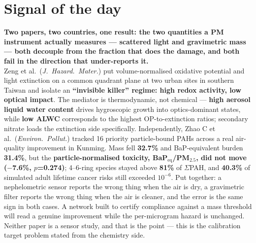 \documentclass[10pt]{article}
\begin{document}
\vspace{6mm}

\section*{\sffamily\bfseries\color{Deep}Signal of the day}
\vspace{-1.5mm}{\color{Amber}\rule{\linewidth}{1.1pt}}\vspace{2.5mm}

\begin{keybox}
{\sffamily\bfseries\small\color{Deep}Two papers, two countries, one result: the two
quantities a PM instrument actually measures --- scattered light and gravimetric mass ---
both decouple from the fraction that does the damage, and both fail in the direction that
under-reports it.}\\[1.4mm]
\footnotesize
Zeng et al.\ (\textit{J.\ Hazard.\ Mater.}) put volume-normalised oxidative potential and
light extinction on a common quadrant plane at two urban sites in southern Taiwan and
isolate an \textbf{``invisible killer'' regime: high redox activity, low optical impact}.
The mediator is thermodynamic, not chemical --- \textbf{high aerosol liquid water content}
drives hygroscopic growth into optics-dominant states, while \textbf{low ALWC} corresponds
to the highest OP-to-extinction ratios; secondary nitrate loads the extinction side
specifically. Independently, Zhao C et al.\ (\textit{Environ.\ Pollut.}) tracked 16 priority
particle-bound PAHs across a real air-quality improvement in Kunming. Mass fell
\textbf{32.7\%} and BaP-equivalent burden \textbf{31.4\%}, but the
\textbf{particle-normalised toxicity, BaP$_{\mathrm{eq}}$/PM$_{2.5}$, did not move
($-$7.6\%, $p$=0.274)}; 4--6-ring species stayed above \textbf{81\%} of $\Sigma$PAH, and
\textbf{40.3\%} of simulated adult lifetime cancer risks still exceeded $10^{-6}$.
Put together: a nephelometric sensor reports the wrong thing when the air is dry, a
gravimetric filter reports the wrong thing when the air is cleaner, and the error is the
same sign in both cases. A network built to certify compliance against a mass threshold
will read a genuine improvement while the per-microgram hazard is unchanged. Neither paper
is a sensor study, and that is the point --- this is the calibration target problem stated
from the chemistry side.
\end{keybox}

\vspace{3mm}
\end{document}
